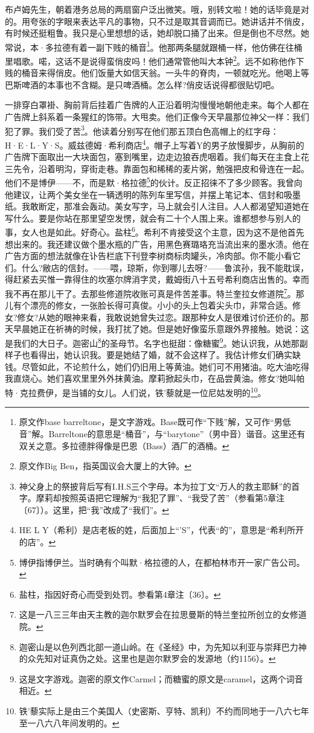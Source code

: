 \par 布卢姆先生，朝着港务总局的两扇窗户泛出微笑。哦，别转文啦！她的话毕竟是对的。用夸张的字眼来表达平凡的事物，只不过是取其音调而已。她讲话并不俏皮，有时候还挺粗鲁。我只是心里想想的话，她却脱口捅了出来。但是倒也不尽然。她常说，本·多拉德有着一副下贱的桶音\footnote{原文作base barreltone，是文字游戏。Base既可作“下贱”解，又可作“男低音”解。Barreltone的意思是“桶音”，与“barytone”（男中音）谐音。这里还有双关之意。多拉德胖得像是巴恩（Bass）酒厂的酒桶。}。他那两条腿就跟桶一样，他仿佛在往桶里唱歌。喏，这话不是说得蛮俏皮吗！他们通常管他叫大本钟\footnote{原文作Big Ben，指英国议会大厦上的大钟。}。远不如称他作下贱的桶音来得俏皮。他们饭量大如信天翁。一头牛的脊肉，一顿就吃光。他喝上等巴斯啤酒的本事也不含糊。是只啤酒桶。怎么样?俏皮话说得都很贴切吧。
\par 一排穿白罩褂、胸前背后挂着广告牌的人正沿着明沟慢慢地朝他走来。每个人都在广告牌上斜系着一条猩红的饰带。大甩卖。他们正像今天早晨那位神父一样：我们犯了罪。我们受了苦\footnote{神父身上的祭披背后写有I.H.S三个字母。本为拉丁文“万人的救主耶稣”的首字。摩莉却按照英语把它理解为“我犯了罪”、“我受了苦”（参看第5章注〔67〕）。这里，把“我”改成了“我们”。}。他读着分别写在他们那五顶白色高帽上的红字母：H·E·L·Y·S。威兹德姆·希利商店\footnote{HE L Y（希利）是店老板的姓，后面加上“’S”，代表“的”，意思是“希利所开的店”。}。帽子上写着Y的男子放慢脚步，从胸前的广告牌下面取出一大块面包，塞到嘴里，边走边狼吞虎咽着。我们每天在主食上花三先令，沿着明沟，穿街走巷。靠面包和稀稀的麦片粥，勉强把皮和骨连在一起。他们不是博伊——不，而是默·格拉德\footnote{博伊指博伊兰。当时确有个叫默·格拉德的人，在都柏林市开一家广告公司。}的伙计。反正招徕不了多少顾客。我曾向他建议，让两个美女坐在一辆透明的陈列车里写信，并摆上笔记本、信封和吸墨纸。我敢断定，那准会轰动。美女写字，马上就会引人注目。人人都渴望知道她在写什么。要是你站在那里望空发愣，就会有二十个人围上来。谁都想参与别人的事，女人也是如此。好奇心。盐柱\footnote{盐柱，指因好奇心而受到处罚。参看第4章注〔36〕。}。希利不肯接受这个主意，因为这不是他首先想出来的。我还建议做个墨水瓶的广告，用黑色赛璐珞充当流出来的墨水渍。他在广告方面的想法就像在讣告栏底下刊登李树商标肉罐头，冷肉部。你不能小看它们。什么?敝店的信封。——喂，琼斯，你到哪儿去呀?——鲁滨孙，我不能耽误，得赶紧去买惟一靠得住的坎塞尔牌消字灵，戴姆街八十五号希利商店出售的。幸而我不再在那儿干了。去那些修道院收账可真是件苦差事。特兰奎拉女修道院\footnote{这是一八三三年由天主教的迦尔默罗会在拉思曼斯的特兰奎拉所创立的女修道院。}。那儿有个漂亮的修女，一张脸长得可真俊。小小的头上包着尖头巾，非常合适。修女?修女?从她的眼神来看，我敢说她曾失过恋。跟那种女人是很难讨价还价的。那天早晨她正在祈祷的时候，我打扰了她。但是她好像蛮乐意跟外界接触。她说：这是我们的大日子。迦密山\footnote{迦密山是以色列西北部一道山岭。在《圣经》中，为先知以利亚与崇拜巴力神的众先知对证真伪之处。这里也是迦尔默罗会的发源地（约1156）。}的圣母节。名字也挺甜：像糖蜜\footnote{这是文字游戏。迦密的原文作Carmel；而糖蜜的原文是caramel，这两个词音相近。}。她认识我，从她那副样子也看得出，她认识我。要是她结了婚，就不会这样了。我估计修女们确实缺钱。尽管如此，不论煎什么，她们仍旧用上等黄油。她们可不用猪油。吃大油吃得我直烧心。她们喜欢里里外外抹黄油。摩莉掀起头巾，在品尝黄油。修女?她叫帕特·克拉费伊，是当铺的女儿。人们说，铁'藜就是一位尼姑发明的\footnote{铁'藜实际上是由三个美国人（史密斯、亨特、凯利）不约而同地于一八六七年至一八六八年间发明的。}。
